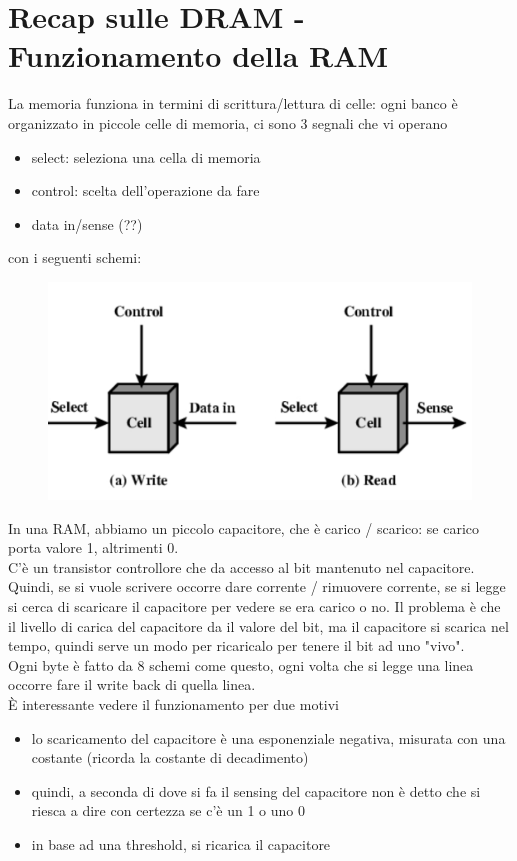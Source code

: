 \documentclass[12pt, oneside]{extbook} %
\begin{document}
\section{Recap sulle DRAM - Funzionamento della RAM}
La memoria funziona in termini di scrittura/lettura di celle: ogni banco è organizzato in piccole celle di memoria, ci sono 3 segnali che vi operano
\begin{itemize}
\item select: seleziona una cella di memoria
\item control: scelta dell'operazione da fare
\item data in/sense (??)
\end{itemize}
con i seguenti schemi:\\
\begin{figure}[!h]
	\includegraphics[scale=0.4]{immagini/accesso_cella_memoria.png}
\end{figure}
In una RAM, abbiamo un piccolo capacitore, che è carico / scarico: se carico porta valore 1, altrimenti 0.\\C'è un transistor controllore che da accesso al bit mantenuto nel capacitore. Quindi, se si vuole scrivere occorre dare corrente / rimuovere corrente, se si legge si cerca di scaricare il capacitore per vedere se era carico o no. Il problema è che il livello di carica del capacitore da il valore del bit, ma il capacitore si scarica nel tempo, quindi serve un modo per ricaricalo per tenere il bit ad uno "vivo".\\ Ogni byte è fatto da 8 schemi come questo, ogni volta che si legge una linea occorre fare il write back di quella linea.\\ È interessante vedere il funzionamento per due motivi
\begin{itemize}
\item lo scaricamento del capacitore è una esponenziale negativa, misurata con una costante (ricorda la costante di decadimento)
\item quindi, a seconda di dove si fa il sensing del capacitore non è detto che si riesca a dire con certezza se c'è un 1 o uno 0
\item in base ad una threshold, si ricarica il capacitore
\end{itemize}
\end{document}
